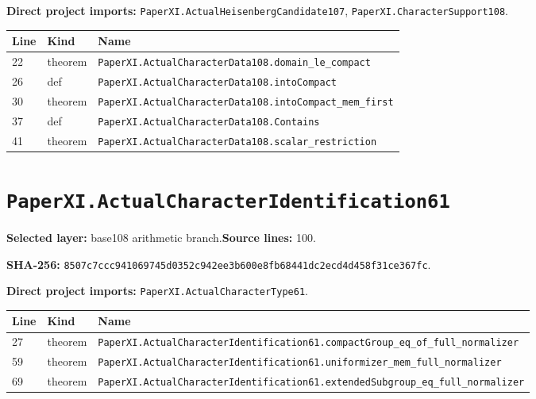 \documentclass[10pt,oneside]{book}
\begin{document}

\textbf{Direct project imports:} \nolinkurl{PaperXI.ActualHeisenbergCandidate107}, \nolinkurl{PaperXI.CharacterSupport108}.

\begin{longtable}{@{}p{}p{}p{}@{}}\toprule Line&Kind&Name\\\midrule\endhead

22&theorem&\nolinkurl{PaperXI.ActualCharacterData108.domain_le_compact}\\

26&def&\nolinkurl{PaperXI.ActualCharacterData108.intoCompact}\\

30&theorem&\nolinkurl{PaperXI.ActualCharacterData108.intoCompact_mem_first}\\

37&def&\nolinkurl{PaperXI.ActualCharacterData108.Contains}\\

41&theorem&\nolinkurl{PaperXI.ActualCharacterData108.scalar_restriction}\\

\bottomrule\end{longtable}

\section{\texorpdfstring{\nolinkurl{PaperXI.ActualCharacterIdentification61}}{PaperXI.ActualCharacterIdentification61}}\label{module:PaperXI.ActualCharacterIdentification61}

\textbf{Selected layer:} base108 arithmetic branch.\quad\textbf{Source lines:} 100.\par\textbf{SHA-256:} {\scriptsize\nolinkurl{8507c7ccc941069745d0352c942ee3b600e8fb68441dc2ecd4d458f31ce367fc}}.


\textbf{Direct project imports:} \nolinkurl{PaperXI.ActualCharacterType61}.

\begin{longtable}{@{}p{}p{}p{}@{}}\toprule Line&Kind&Name\\\midrule\endhead

27&theorem&\nolinkurl{PaperXI.ActualCharacterIdentification61.compactGroup_eq_of_full_normalizer}\\

59&theorem&\nolinkurl{PaperXI.ActualCharacterIdentification61.uniformizer_mem_full_normalizer}\\

69&theorem&\nolinkurl{PaperXI.ActualCharacterIdentification61.extendedSubgroup_eq_full_normalizer}\\

\bottomrule\end{longtable}
\end{document}
